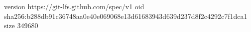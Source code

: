 version https://git-lfs.github.com/spec/v1
oid sha256:b288db91c36748aa0e40e069068e13d61683943d639d237d8f2c4292c7f1dca1
size 349680
